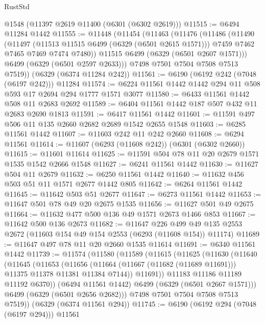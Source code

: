 \begin{lexlean}{RustStd}
\begin{coremodule}
{{    @1548
    (@11397 @2619 @11400 (@6301 (@6302 @2619)))
@11515 := @6494 @11284 @1442
@11555 := @11448
    (@11454
      (@11463
        (@11476
          (@11486
            (@11490
              (@11497
                (@11513 @11515 @6499 (@6329 (@6501 @2615 @1571)))
                @7459
                @7462
                @7465
                @7469
                @7474
                @7480))
            @11515
            @6499
            (@6329 (@6501 @2607 @1571)))
          @6499
          (@6329 (@6501 @2597 @2633)))
        @7498
        @7501
        @7504
        @7508
        @7513
        @7519))
    (@6329 (@6374 @11284 @242))
@11561 := @6190 (@6192 @242 (@7048 (@6197 @242))) @11284
@11574 := @6224 @11561 @1442 @1442 @294 @11 @508 @593 @17 @2694 @294 @1777 @1571 @3077
@11580 := @6433 @11561 @1442 @508 @11 @2683 @2692
@11589 := @6404 @11561 @1442 @187 @507 @432 @11 @2683 @2690 @1813
@11591 := @6417 @11561 @1442
@11601 := @11591 @497 @506 @11 @135 @2660 @2682 @2689 @1542 @2655 @1548
@11603 := @6285 @11561 @1442
@11607 := @11603 @242 @11 @242 @2660
@11608 := @6294 @11561
@11614 := @11607 (@6293 (@11608 @242)) (@6301 (@6302 @2660))
@11615 := @11601 @11614
@11625 := @11591 @504 @78 @11 @20 @2679 @1571 @1535 @1542 @2666 @1548
@11627 := @6241 @11561 @1442
@11630 := @11627 @504 @11 @2679
@11632 := @6250 @11561 @1442
@11640 := @11632 @456 @503 @51 @11 @1571 @2677 @1442 @805
@11642 := @6264 @11561 @1442
@11645 := @11642 @503 @51 @2677
@11647 := @6273 @11561 @1442
@11653 := @11647 @501 @78 @49 @20 @2675 @1535
@11656 := @11627 @501 @49 @2675
@11664 := @11632 @477 @500 @136 @49 @1571 @2673 @1466 @853
@11667 := @11642 @500 @136 @2673
@11682 := @11647
    @226
    @499
    @49
    @135
    @2553
    @2672
    (@11603 @154 @49 @154 @2553 (@6293 (@11608 @154)) @11174)
@11689 := @11647 @497 @78 @11 @20 @2660 @1535 @11614
@11691 := @6340 @11561 @1442
@11739 := @11574
    (@11580
      (@11589
        (@11615
          (@11625
            (@11630
              (@11640
                (@11645
                  (@11653
                    (@11656
                      (@11664 (@11667 (@11682 (@11689 @11691))) @11375 @11378 @11381 @11384 @7144))
                    @11691))
                @11183
                @11186
                @11189
                @11192
                @6370))
            (@6494 @11561 @1442)
            @6499
            (@6329 (@6501 @2667 @1571)))
          @6499
          (@6329 (@6501 @2656 @2682)))
        @7498
        @7501
        @7504
        @7508
        @7513
        @7519))
    (@6329 (@6374 @11561 @294))
@11745 := @6190 (@6192 @294 (@7048 (@6197 @294))) @11561
}}
\end{coremodule}
\end{lexlean}
